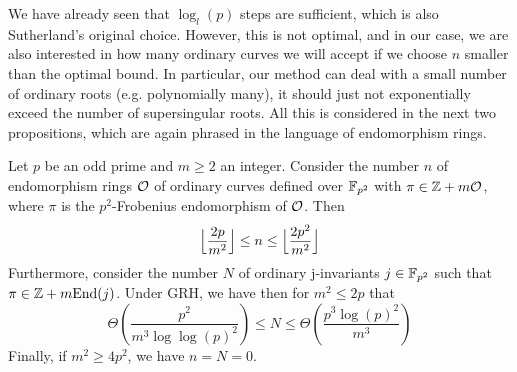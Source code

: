 We have already seen that $\log_l(p)$ steps are sufficient, which is also Sutherland's original choice.
However, this is not optimal, and in our case, we are also interested in how many ordinary curves we will accept if we choose $n$ smaller than the optimal bound.
In particular, our method can deal with a small number of ordinary roots (e.g. polynomially many), it should just not exponentially exceed the number of supersingular roots.
All this is considered in the next two propositions, which are again phrased in the language of endomorphism rings.
\begin{prop}
    \label{prop:frobenius_in_nonmaximal_order}
    Let $p$ be an odd prime and $m \geq 2$ an integer.
    Consider the number $n$ of endomorphism rings $\mathcal{O}$ of ordinary curves defined over $\mathbb{F}_{p^2}$ with $\pi \in \mathbb{Z} + m\mathcal{O}$, where $\pi$ is the $p^2$-Frobenius endomorphism of $\mathcal{O}$.
    Then
    \begin{equation*}
        \Bigl\lfloor \frac {2p} {m^2} \Bigr\rfloor \leq n \leq \Bigl\lfloor \frac {2p^2} {m^2} \Bigr\rfloor
    \end{equation*}
    Furthermore, consider the number $N$ of ordinary j-invariants $j \in \mathbb{F}_{p^2}$ such that $\pi \in \mathbb{Z} + m\mathrm{End}(j)$.
    Under GRH, we have then for $m^2 \leq 2p$ that
    \begin{equation*}
        \Theta\left( \frac {p^2} {m^3 \log\log(p)^2} \right) \leq N \leq \Theta\left( \frac {p^3\log(p)^2} {m^3} \right)
    \end{equation*}
    Finally, if $m^2 \geq 4p^2$, we have $n = N = 0$.
\end{prop}
